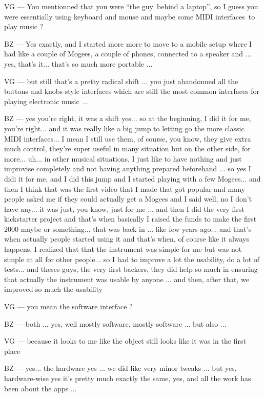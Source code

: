 VG — You mentionned that you were ``the guy behind a laptop'', so I guess you were essentially using keyboard and mouse and maybe some MIDI interfaces to play music ?

BZ — Yes exactly, and I started more more to move to a mobile setup where I had like a couple of Mogees, a couple of phones, connected to a speaker and ... yes, that's it... that's so much more portable ... 

VG — but still that's a pretty radical shift ... you just abandonned all the buttons and knobs-style interfaces which are still the most common interfaces for playing electronic music ...

BZ — yes you're right, it was a shift yes... so at the beginning, I did it for me, you're right... and it was really like a big jump to letting go the more classic MIDI interfaces... I mean I still use them, of course, you know, they give extra much control, they're super useful in many situation but on the other side, for more... uh... in other musical situations, I just like to have nothing and just improvise completely and not having anything prepared beforehand ... so yes I didi it for me, and I did this jump and I started playing with a few Mogees... and then I think that was the first video that I made that got popular and many people asked me if they could actually get a Mogees and I said well, no I don't have any... it was just, you know, just for me ... and then I did the very first kickstarter project and that's when basically I raised the funds to make the first 2000 maybe or something... that was back in ... like few years ago... and that's when actually people started using it and that's when, of course like it always happens, I realized that that the instrument was simple for me but was not simple at all for other people... so I had to improve a lot the usability, do a lot of tests... and theses guys, the very first backers, they did help so much in ensuring that actually the instrument was usable by anyone ... and then, after that, we improved so much the usability 

VG — you mean the software interface ? 

BZ — both ... yes, well mostly software, mostly software ... but also ...

VG — because it looks to me like the object still looks like it was in the first place 

BZ —  yes...  the hardware yes ... we did like very minor tweaks ... but yes, hardware-wise yes it's pretty much exactly the same, yes, and all the work has been about the apps ... 

